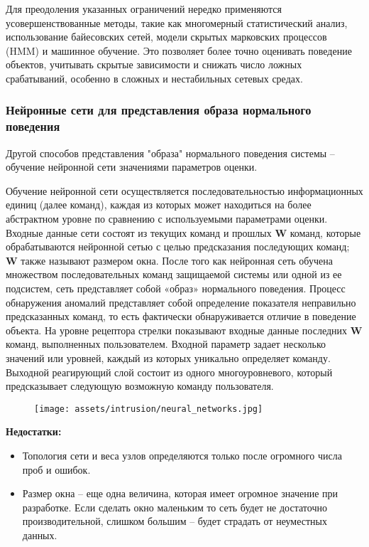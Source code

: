 Для преодоления указанных ограничений нередко применяются усовершенствованные методы,
такие как многомерный статистический анализ, использование байесовских сетей, модели скрытых марковских процессов (HMM) и машинное обучение. Это позволяет более точно оценивать поведение объектов, учитывать скрытые зависимости и снижать число ложных срабатываний, особенно в сложных и нестабильных сетевых средах.

\subsubsection{Нейронные сети для представления образа нормального поведения}
Другой способов представления "образа" нормального поведения системы – обучение нейронной
сети значениями параметров оценки.

Обучение нейронной сети осуществляется последовательностью информационных единиц (далее команд),
каждая из которых может находиться на более абстрактном уровне по сравнению с используемыми
параметрами оценки. Входные данные сети состоят из текущих команд и прошлых \textbf{W} команд, которые
обрабатываются нейронной сетью с целью предсказания последующих команд; \textbf{W} также называют размером
окна. После того как нейронная сеть обучена множеством последовательных команд защищаемой системы или
одной из ее подсистем, сеть представляет собой «образ» нормального поведения. Процесс обнаружения
аномалий представляет собой определение показателя неправильно предсказанных команд,
то есть фактически обнаруживается отличие в поведение объекта. На уровне рецептора стрелки
показывают входные данные последних \textbf{W} команд, выполненных пользователем. Входной параметр задает
несколько значений или уровней, каждый из которых уникально определяет команду. Выходной реагирующий
слой состоит из одного многоуровневого, который предсказывает следующую возможную команду пользователя.
\autocite{BeynonDavies}

\begin{figure}[h!]
    \centering
    \texttt{[image: assets/intrusion/neural\_networks.jpg]}
\end{figure}

\textbf{Недостатки:}
\begin{itemize}
    \item Топология сети и веса узлов определяются только после огромного числа проб и ошибок.
    \item Размер окна – еще одна величина, которая имеет огромное значение при разработке.
    Если сделать окно маленьким то сеть будет не достаточно производительной, слишком большим
    – будет страдать от неуместных данных.
\end{itemize}

